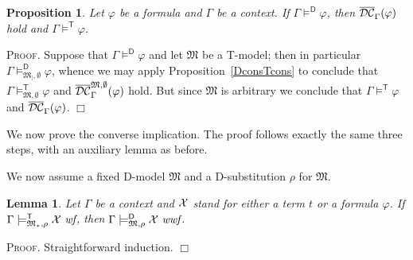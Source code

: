 \documentclass{article}
\newtheorem{lemma}[definition]{Lemma}
\newtheorem{proposition}[definition]{Proposition}
\newenvironment{proof}{\smallskip\textsc{Proof.}}{\hspace*{\fill}$\Box$}
\newcommand{\D}{\textsf D}
\newcommand{\T}{\textsf T}
\newcommand{\modelfun}[1]{\ensuremath{{#1}_\ast}}
\newcommand{\restrfun}[1]{\ensuremath{{#1}_|}}
\newcommand{\wf}{\ \mbox{\em wf}}
\newcommand{\wwf}{\ \mbox{\em wwf}}
\newcommand{\mymodels}[1]{\ensuremath{\models^{\mathsf{#1}}}}
\newcommand{\mymodelss}[3]{\ensuremath{\models_{\mathfrak{#2},{#3}}^{\mathsf{#1}}}}
\newcommand{\semDC}[2][{\mathfrak M},\rho]{\ensuremath{\overline{\cal{DC}}^{#1}_{#2}}}
\begin{document}
\begin{proposition}\label{DvalTval}
Let $\varphi$ be a formula and $\Gamma$ be a context.  If
$\Gamma\mymodels{D}\varphi$, then $\semDC[{}]{\Gamma}(\varphi)$ hold
and $\Gamma\mymodels{T}\varphi$.
\end{proposition}
\begin{proof}
Suppose that $\Gamma\mymodels{D}\varphi$ and let $\mathfrak M$ be
a {\T}-model; then in particular
$\Gamma\mymodelss{D}{\restrfun M}\emptyset\varphi$, whence we may apply
Proposition~\ref{DconsTcons} to conclude that
$\Gamma\mymodelss{T}M\emptyset\varphi$ and
$\semDC[{\mathfrak M},\emptyset]{\Gamma}(\varphi)$ hold.  But since
$\mathfrak M$ is arbitrary we conclude that
$\Gamma\mymodels{T}\varphi$ and $\semDC[{}]{\Gamma}(\varphi)$.
\end{proof}

\bigskip\noindent
We now prove the converse implication.  The proof follows exactly the same
three steps, with an auxiliary lemma as before.

We now assume a fixed {\D}-model $\mathfrak M$ and a {\D}-substitution $\rho$
for $\mathfrak M$.
\begin{lemma}\label{TwfDwwf} Let $\Gamma$ be a context and ${\cal X}$
stand for either a term $t$ or a formula $\varphi$.
If $\Gamma\mymodelss{T}{\modelfun M}\rho{\cal X}\wf$,
then $\Gamma\mymodelss{D}M\rho{\cal X}\wwf$.
\end{lemma}
\begin{proof}
Straightforward induction.
\end{proof}
\end{document}
